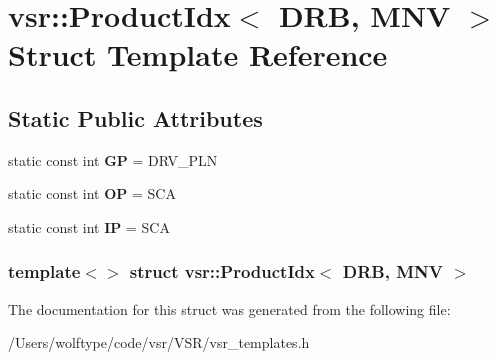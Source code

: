 \hypertarget{structvsr_1_1_product_idx_3_01_d_r_b_00_01_m_n_v_01_4}{\section{vsr\-:\-:Product\-Idx$<$ D\-R\-B, M\-N\-V $>$ Struct Template Reference}
\label{structvsr_1_1_product_idx_3_01_d_r_b_00_01_m_n_v_01_4}
}
\subsection*{Static Public Attributes}
\begin{DoxyCompactItemize}
\item 
\hypertarget{structvsr_1_1_product_idx_3_01_d_r_b_00_01_m_n_v_01_4_a8aa8364554ab81c0b6814a6f54278fb2}{static const int {\bfseries G\-P} = D\-R\-V\-\_\-\-P\-L\-N}\label{structvsr_1_1_product_idx_3_01_d_r_b_00_01_m_n_v_01_4_a8aa8364554ab81c0b6814a6f54278fb2}

\item 
\hypertarget{structvsr_1_1_product_idx_3_01_d_r_b_00_01_m_n_v_01_4_af7ab7c84135acfe44a08babd6c282c19}{static const int {\bfseries O\-P} = S\-C\-A}\label{structvsr_1_1_product_idx_3_01_d_r_b_00_01_m_n_v_01_4_af7ab7c84135acfe44a08babd6c282c19}

\item 
\hypertarget{structvsr_1_1_product_idx_3_01_d_r_b_00_01_m_n_v_01_4_a0bca6b90b3c485dcbb8550c6f9e5d618}{static const int {\bfseries I\-P} = S\-C\-A}\label{structvsr_1_1_product_idx_3_01_d_r_b_00_01_m_n_v_01_4_a0bca6b90b3c485dcbb8550c6f9e5d618}

\end{DoxyCompactItemize}
\subsubsection*{template$<$$>$ struct vsr\-::\-Product\-Idx$<$ D\-R\-B, M\-N\-V $>$}



The documentation for this struct was generated from the following file\-:\begin{DoxyCompactItemize}
\item 
/\-Users/wolftype/code/vsr/\-V\-S\-R/vsr\-\_\-templates.\-h\end{DoxyCompactItemize}
